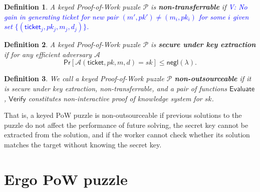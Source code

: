 \documentclass[]{article}
\newcommand{\vk}[1]{\textcolor{blue}{V: {#1}}}
\newcommand{\Ticket}{\mathsf{ticket}}
\newcommand{\Eval}{\mathsf{Evaluate}}
\newcommand{\Verify}{\mathsf{Verify}}
\newtheorem{definition}{Definition}
\begin{document}
    \begin{definition}
        A keyed Proof-of-Work puzzle $\mathcal{P}$ is {\bf non-transferrable} if
        \vk{No gain in generating ticket for new pair $(m',pk')\ne (m_i,pk_i)$
            for some $i$ given set $\{(\Ticket_j, pk_j, m_j, d_j)\}$.}
    \end{definition}

    \begin{definition}
        A keyed Proof-of-Work puzzle $\mathcal{P}$ is {\bf secure under key
        extraction} if for any efficient adversary $\mathcal{A}$
        \begin{equation}
            \mathsf{Pr}[\mathcal{A}(\Ticket,pk,m,d)=sk]\le\mathsf{negl}(\lambda).
        \end{equation}
    \end{definition}

    \begin{definition}
        We call a keyed Proof-of-Work puzzle $\mathcal{P}$ {\bf
        non-outsourceable} if it is secure under key extraction,
        non-transferrable, and a pair of functions $\Eval$, $\Verify$
        constitutes non-interactive proof of knowledge system for $sk$.
    \end{definition}

    That is, a keyed PoW puzzle is non-outsourceable if previous solutions to
    the puzzle do not affect the performance of future solving, the secret key
    cannot be extracted from the solution, and if the worker cannot check
    whether its solution matches the target without knowing the secret key.

    \section{Ergo PoW puzzle}
    \label{puzzle}
\end{document}
